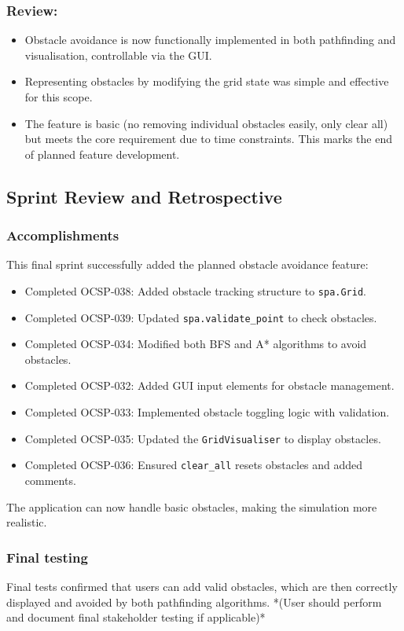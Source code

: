 \subsubsection{Review:}
\begin{itemize}
	\item Obstacle avoidance is now functionally implemented in both pathfinding and visualisation, controllable via the GUI.
	\item Representing obstacles by modifying the grid state was simple and effective for this scope.
	\item The feature is basic (no removing individual obstacles easily, only clear all) but meets the core requirement due to time constraints. This marks the end of planned feature development.
\end{itemize}

\subsection{Sprint Review and Retrospective}

\subsubsection{Accomplishments}
This final sprint successfully added the planned obstacle avoidance feature:
\begin{itemize}
    \item Completed OCSP-038: Added obstacle tracking structure to \verb|spa.Grid|.
    \item Completed OCSP-039: Updated \verb|spa.validate_point| to check obstacles.
	\item Completed OCSP-034: Modified both BFS and A* algorithms to avoid obstacles.
	\item Completed OCSP-032: Added GUI input elements for obstacle management.
	\item Completed OCSP-033: Implemented obstacle toggling logic with validation.
	\item Completed OCSP-035: Updated the \verb|GridVisualiser| to display obstacles.
	\item Completed OCSP-036: Ensured \verb|clear_all| resets obstacles and added comments.
\end{itemize}
The application can now handle basic obstacles, making the simulation more realistic.

\subsubsection{Final testing}
Final tests confirmed that users can add valid obstacles, which are then correctly displayed and avoided by both pathfinding algorithms.
*(User should perform and document final stakeholder testing if applicable)*

